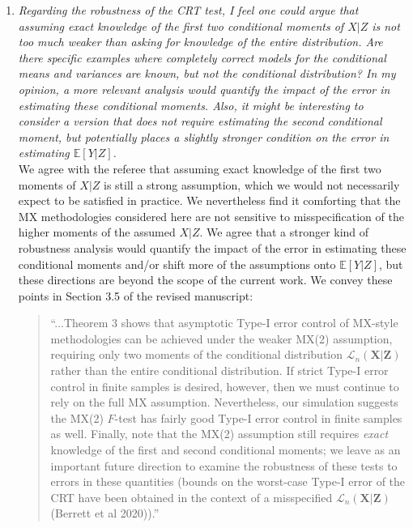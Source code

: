 \documentclass[12pt]{article}
\begin{document}
\begin{enumerate}
	
	
	\item \textsl{Regarding the robustness of the CRT test, I feel one could argue that assuming exact knowledge of the first two conditional moments of $X | Z$ is not too much weaker than asking for knowledge of the entire distribution. Are there specific examples where completely correct models for the conditional means and variances are known, but not the conditional distribution? In my opinion, a more relevant analysis would quantify the impact of the error in estimating these conditional moments. Also, it might be interesting to consider a version that does not require estimating the second conditional moment, but potentially places a slightly stronger condition on the error in estimating $\mathbb E[Y | Z]$.}\\
	
	We agree with the referee that assuming exact knowledge of the first two moments of $X|Z$ is still a strong assumption, which we would not necessarily expect to be satisfied in practice. We nevertheless find it comforting that the MX methodologies considered here are not sensitive to misspecification of the higher moments of the assumed $X|Z$. We agree that a stronger kind of robustness analysis would quantify the impact of the error in estimating these conditional moments and/or shift more of the assumptions onto $\mathbb E[Y|Z]$, but these directions are beyond the scope of the current work. We convey these points in Section 3.5 of the revised manuscript:
	\begin{quote}
	``...Theorem 3 shows that asymptotic Type-I error control of MX-style methodologies can be achieved under the weaker MX(2) assumption, requiring only two moments of the conditional distribution $\mathcal L_n(\bm X | \bm Z)$ rather than the entire conditional distribution. If strict Type-I error control in finite samples is desired, however, then we must continue to rely on the full MX assumption. Nevertheless, our simulation suggests the MX(2) $F$-test has fairly good Type-I error control in finite samples as well. Finally, note that the MX(2) assumption still requires \textit{exact} knowledge of the first and second conditional moments; we leave as an important future direction to examine the robustness of these tests to errors in these quantities (bounds on the worst-case Type-I error of the CRT have been obtained in the context of a misspecified $\mathcal L_n(\bm X | \bm Z)$ (Berrett et al 2020)).''
	\end{quote}


\end{enumerate}
\end{document}
